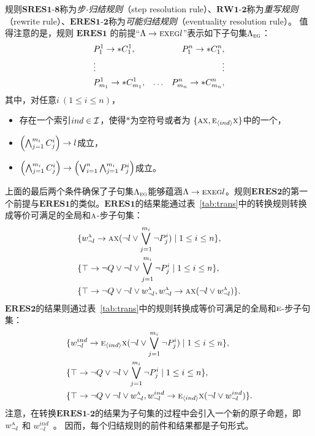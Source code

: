 规则$\textbf{SRES1-8}$称为\emph{步-归结规则}（step resolution rule）、$\textbf{RW1-2}$称为\emph{重写规则}（rewrite rule）、$\textbf{ERES1-2}$称为\emph{可能归结规则}（eventuality resolution rule）。
值得注意的是，规则 $\textbf{ERES1}$ 的前提“$\Lambda \rightarrow \textsc{e} \textsc{x} \textsc{e}\textsc{g} l$”表示如下子句集$\Lambda_{\textsc{e}\textsc{g}}$：
\begin{align*}
	& P_1^1\rightarrow *C_1^1, & & & P_1^n\rightarrow *C_1^n,\\
	& \vdots & && \vdots\\
	& P_{m_1}^1 \rightarrow * C_{m_1}^1, & \ldots && P_{m_n}^n\rightarrow *C_{m_n}^n,
\end{align*}
其中，对任意$i~(1\le i\le n)$，
\begin{itemize}
	\item 存在一个索引$ind \in {\cal I}$，使得$*$为空符号或者为 $\{\textsc{a}\textsc{x}, \textsc{e}_{{\langle{ind}\rangle}}\textsc{x}\}$中的一个，
	\item $\left(\bigwedge_{j=1}^{m_i} C_j^i\right) \rightarrow l$成立，
	\item $\left(\bigwedge_{j=1}^{m_i} C_j^i\right) \rightarrow \left(\bigvee_{i=1}^n\bigwedge_{j=1}^{m_i} P_j^i\right)$成立。
\end{itemize}

上面的最后两个条件确保了子句集$\Lambda_{\textsc{e}\textsc{g}}$能够蕴涵$\Lambda \rightarrow \textsc{e} \textsc{x} \textsc{e}\textsc{g} l$。规则$\textbf{ERES2}$的第一个前提与$\textbf{ERES1}$的类似。$\textbf{ERES1}$的结果能通过表~\ref{tab:trans}中的转换规则转换成等价可满足的全局和$\textsc{a}$-步子句集：
\begin{align*}
	& \{w_{\neg l}^{\textsc{a}} \rightarrow \textsc{a}\textsc{x}(\neg l \vee \bigvee_{j=1}^{m_i} \neg P_j^i) \mid 1 \leq i \leq n\},\\
	& \{\top \rightarrow \neg Q \vee \neg l \vee \bigvee_{j=1}^{m_i} \neg P_j^i \mid 1 \leq i \leq n\},\\
	& \{\top \rightarrow \neg Q \vee \neg l \vee w_{\neg l}^{\textsc{a}}, w_{\neg l}^{\textsc{a}} \rightarrow \textsc{a}\textsc{x}(\neg l \vee w_{\neg l}^{\textsc{a}})\}.
\end{align*}
$\textbf{ERES2}$的结果则通过表~\ref{tab:trans}中的规则转换成等价可满足的全局和$\textsc{e}$-步子句集：
\begin{align*}
	& \{w_{\neg l}^{ind} \rightarrow \textsc{e}_{{\langle{ind}\rangle}}\textsc{x}(\neg l \vee \bigvee_{j=1}^{m_i} \neg P_j^i) \mid 1 \leq i \leq n\},\\
	& \{\top \rightarrow \neg Q \vee \neg l \vee \bigvee_{j=1}^{m_i} \neg P_j^i \mid 1 \leq i \leq n\},\\
	& \{\top \rightarrow \neg Q \vee \neg l \vee w_{\neg l}^{\textsc{a}}, w_{\neg l}^{ind} \rightarrow \textsc{e}_{{\langle{ind}\rangle}}\textsc{x}(\neg l \vee w_{\neg l}^{ind})\}.
\end{align*}
注意，在转换$\textbf{ERES1-2}$的结果为子句集的过程中会引入一个新的原子命题，即$w_{\neg l}^{\textsc{a}}$ 和 $w_{\neg l}^{ind}$~\cite{zhang2014resolution}。
因而，每个归结规则的前件和结果都是子句形式。

